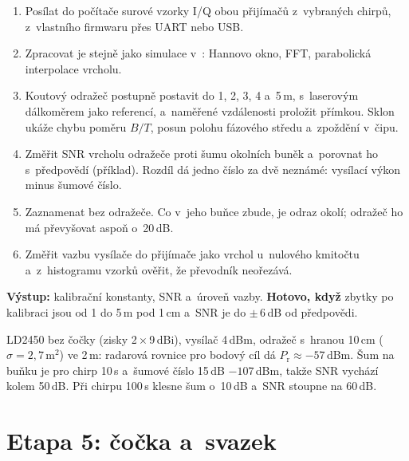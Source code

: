 \documentclass[czech]{skyren}
\begin{document}
\begin{enumerate}
\item Posílat do počítače surové vzorky I/Q obou přijímačů z~vybraných
  chirpů, z~vlastního firmwaru přes UART nebo USB.
\item Zpracovat je stejně jako simulace v~: Hannovo okno,
  FFT, parabolická interpolace vrcholu.
\item Koutový odražeč postupně postavit do 1, 2, 3, 4 a~5\,m, s~laserovým
  dálkoměrem jako referencí, a~naměřené vzdálenosti proložit přímkou. Sklon
  ukáže chybu poměru $B/T$, posun polohu fázového středu a~zpoždění v~čipu.
\item Změřit SNR vrcholu odražeče proti šumu okolních buněk a~porovnat ho
  s~předpovědí (příklad). Rozdíl dá jedno číslo za dvě neznámé: vysílací
  výkon minus šumové číslo.
\item Zaznamenat  bez odražeče. Co v~jeho buňce
  zbude, je odraz okolí; odražeč ho má převyšovat aspoň o~20\,dB.
\item Změřit vazbu vysílače do přijímače jako vrchol u~nulového kmitočtu
  a~z~histogramu vzorků ověřit, že převodník neořezává.
\end{enumerate}

\textbf{Výstup:} kalibrační konstanty, SNR a~úroveň vazby. \textbf{Hotovo,
když} zbytky po kalibraci jsou od 1 do 5\,m pod 1\,cm a~SNR je do
$\pm$\,6\,dB od předpovědi.

\begin{skyrenexample}
LD2450 bez čočky (zisky 2\,$\times$\,9\,dBi), vysílač 4\,dBm, odražeč
s~hranou 10\,cm ($\sigma = 2{,}7$\,m$^2$) ve 2\,m: radarová rovnice pro
bodový cíl dá $P_\mathrm{r} \approx -57$\,dBm. Šum na buňku je pro chirp
10\,\textmu s a~šumové číslo 15\,dB $-107$\,dBm, takže SNR vychází kolem
50\,dB. Při chirpu 100\,\textmu s klesne šum o~10\,dB a~SNR stoupne na
60\,dB.
\end{skyrenexample}

\section{Etapa 5: čočka a~svazek}
\end{document}
